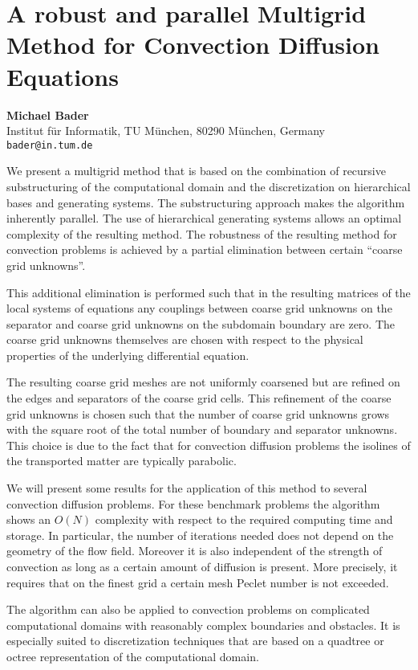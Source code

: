 \documentclass[11pt]{article}
\newcommand{\nextab}[4]{
	\section{#2}
	{\bf #1} \\ \nopagebreak
	{#3} \\ \nopagebreak
	{\tt #4} \nopagebreak
	}
\begin{document}

\nextab
{Michael Bader}
{A robust and parallel Multigrid Method for Convection Diffusion Equations}
{Institut f\"ur Informatik, TU M\"unchen, 80290 M\"unchen, Germany}
{bader@in.tum.de}

We present a multigrid method that is based on the combination of
recursive substructuring of the computational domain and the
discretization on hierarchical bases and generating systems.
The substructuring approach makes the algorithm inherently parallel.
The use of hierarchical generating systems allows an optimal complexity
of the resulting method.
The robustness of the resulting method for convection problems is
achieved by a partial elimination between certain ``coarse grid unknowns''.

This additional elimination is performed such that in the resulting
matrices of the local systems of equations any couplings between coarse
grid unknowns on the separator and coarse grid unknowns on the subdomain
boundary are zero.
The coarse grid unknowns themselves are chosen with respect to the
physical properties of the underlying differential equation.

The resulting coarse grid meshes are not uniformly coarsened but are
refined on the edges and separators of the coarse grid cells.
This refinement of the coarse grid unknowns is chosen such that the
number of coarse grid unknowns grows with the square root of the total
number of boundary and separator unknowns.
This choice is due to the fact that for convection diffusion problems
the isolines of the transported matter are typically parabolic.

We will present some results for the application of this method to several
convection diffusion problems.
For these benchmark problems the algorithm shows an $O(N)$ complexity with
respect to the required computing time and storage.
In particular, the number of iterations needed does not depend on the
geometry of the flow field.
Moreover it is also independent of the strength of convection as long
as a certain amount of diffusion is present.
More precisely, it requires that on the finest grid a certain mesh Peclet
number is not exceeded.

The algorithm can also be applied to convection problems on complicated
computational domains with reasonably complex boundaries and obstacles.
It is especially suited to discretization techniques that are based on
a quadtree or octree representation of the computational domain.
\end{document}
